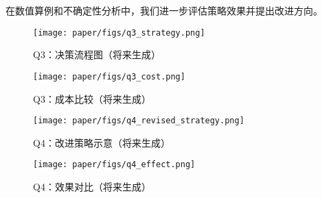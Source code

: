 在数值算例和不确定性分析中，我们进一步评估策略效果并提出改进方向。
\begin{figure}[htbp]\centering
  \texttt{[image: paper/figs/q3\_strategy.png]}
  \caption{Q3：决策流程图（将来生成）}
\end{figure}
\begin{figure}[htbp]\centering
  \texttt{[image: paper/figs/q3\_cost.png]}
  \caption{Q3：成本比较（将来生成）}
\end{figure}
\begin{figure}[htbp]\centering
  \texttt{[image: paper/figs/q4\_revised\_strategy.png]}
  \caption{Q4：改进策略示意（将来生成）}
\end{figure}
\begin{figure}[htbp]\centering
  \texttt{[image: paper/figs/q4\_effect.png]}
  \caption{Q4：效果对比（将来生成）}
\end{figure}
